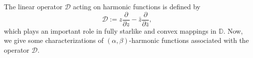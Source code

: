 \documentclass[11pt, reqno]{amsart}
\theoremstyle{definition}
\numberwithin{equation}{section}
\newcommand{\D}{\mbox{$\mathbb{D}$}}
\theoremstyle{remark}
\numberwithin{equation}{section}
\begin{document}
	The linear operator $\mathcal{D}$ acting on harmonic functions is defined by
		\[
		\mathcal{D}
		:= z\frac{\partial}{\partial z}
		- \bar z \frac{\partial}{\partial \bar z},
		\] which plays an important role in fully starlike and convex mappings in $\D$.
        Now, we give some characterizations of $(\alpha,\beta)$-harmonic functions associated with the operator $\mathcal{D}$.
	
	
\end{document}
